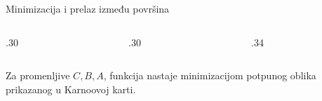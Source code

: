 \begin{frame}[label=02-s052]{Minimizacija i prelaz između površina}
\Rezultat{\(\textcolor{DEcrvena}{F=\bar C\bar B+BA}\)}
\par\vspace{4mm}
\begin{columns}[T,onlytextwidth]
\begin{column}{.30\textwidth}\centering
{}\vspace{4mm}

\end{column}
\begin{column}{.30\textwidth}\centering
{}\vspace{4mm}

\end{column}
\begin{column}{.34\textwidth}\centering
{}\vspace{4mm}

\end{column}
\end{columns}
\par\vspace{5mm}
Za promenljive \(C,B,A\), funkcija nastaje minimizacijom potpunog oblika prikazanog u Karnoovoj karti.
\end{frame}
